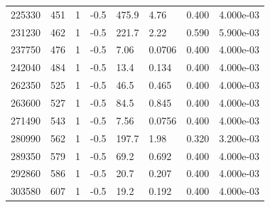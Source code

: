 \documentclass[preview]{standalone}
\begin{document}
{{{{{\begin{tabular}{L{1.2cm}C{1.2cm} C{0.3cm}C{0.5cm} C{1.4cm}C{1.4cm} C{1.4cm}C{1.4cm}}
  225330  &   451  & 1     & -0.5 &  475.9  & 4.76  & 0.400 &  4.000e-03   \\ 
  231230  &   462  & 1     & -0.5 &  221.7  & 2.22  & 0.590 &  5.900e-03   \\ 
  237750  &   476  & 1     & -0.5 &  7.06  & 0.0706  & 0.400 &  4.000e-03   \\ 
  242040  &   484  & 1     & -0.5 &  13.4  & 0.134  & 0.400 &  4.000e-03   \\ 
  262350  &   525  & 1     & -0.5 &  46.5  & 0.465  & 0.400 &  4.000e-03   \\ 
  263600  &   527  & 1     & -0.5 &  84.5  & 0.845  & 0.400 &  4.000e-03   \\ 
  271490  &   543  & 1     & -0.5 &  7.56  & 0.0756  & 0.400 &  4.000e-03   \\ 
  280990  &   562  & 1     & -0.5 &  197.7  & 1.98  & 0.320 &  3.200e-03   \\ 
  289350  &   579  & 1     & -0.5 &  69.2  & 0.692  & 0.400 &  4.000e-03   \\ 
  292860  &   586  & 1     & -0.5 &  20.7  & 0.207  & 0.400 &  4.000e-03   \\ 
  303580  &   607  & 1     & -0.5 &  19.2  & 0.192  & 0.400 &  4.000e-03   \\ 
\hline 
\end{tabular} 

}}}}}
\end{document}
